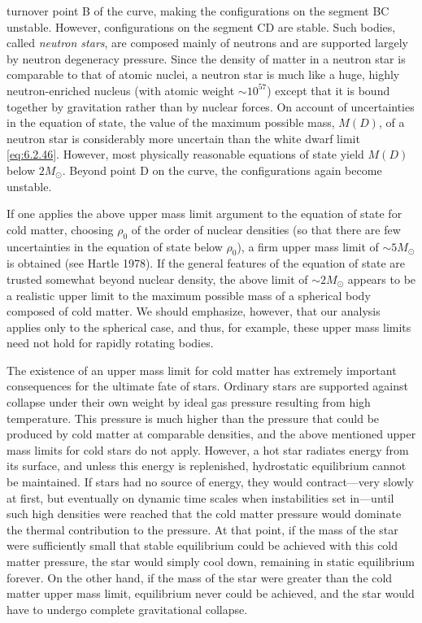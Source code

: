 turnover point B of the curve, making the configurations on the segment BC
unstable. However, configurations on the segment CD are stable. Such bodies,
called \emph{neutron stars}, are composed mainly of neutrons and are supported
largely by neutron degeneracy pressure. Since the density of matter in a neutron
star is comparable to that of atomic nuclei, a neutron star is much like a huge,
highly neutron-enriched nucleus (with atomic weight \(\sim10^{57}\)) except that
it is bound together by gravitation rather than by nuclear forces. On account of
uncertainties in the equation of state, the value of the maximum possible mass,
\(M(D)\), of a neutron star is considerably more uncertain than the white dwarf
limit \eqref{eq:6.2.46}. However, most physically reasonable equations of state
yield \(M(D)\) below \(2M_\odot\). Beyond point D on the curve, the
configurations again become unstable.

If one applies the above upper mass limit argument to the equation of state for
cold matter, choosing \(\rho_0\) of the order of nuclear densities (so that there
are few uncertainties in the equation of state below \(\rho_0\)), a firm upper
mass limit of \(\sim5M_\odot\) is obtained (see Hartle 1978). If the general
features of the equation of state are trusted somewhat beyond nuclear density, the
above limit of \(\sim2M_\odot\) appears to be a realistic upper limit to the
maximum possible mass of a spherical body composed of cold matter. We should
emphasize, however, that our analysis applies only to the spherical case, and
thus, for example, these upper mass limits need not hold for rapidly rotating
bodies.

The existence of an upper mass limit for cold matter has extremely important
consequences for the ultimate fate of stars. Ordinary stars are supported against
collapse under their own weight by ideal gas pressure resulting from high
temperature. This pressure is much higher than the pressure that could be produced
by cold matter at comparable densities, and the above mentioned upper mass limits
for cold stars do not apply. However, a hot star radiates energy from its surface,
and unless this energy is replenished, hydrostatic equilibrium cannot be
maintained. If stars had no source of energy, they would contract---very slowly at
first, but eventually on dynamic time scales when instabilities set in---until such
high densities were reached that the cold matter pressure would dominate the
thermal contribution to the pressure. At that point, if the mass of the star were
sufficiently small that stable equilibrium could be achieved with this cold matter
pressure, the star would simply cool down, remaining in static equilibrium forever.
On the other hand, if the mass of the star were greater than the cold matter upper
mass limit, equilibrium never could be achieved, and the star would have to undergo
complete gravitational collapse.


